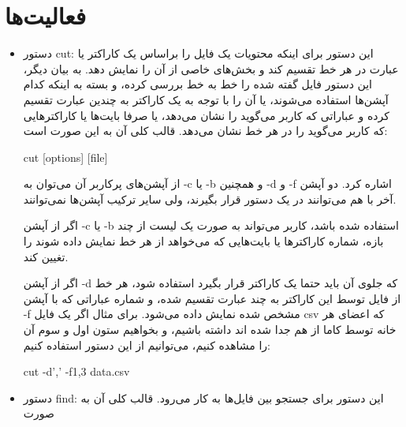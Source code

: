 \documentclass[12pt]{article}
\begin{document}
        \section{فعالیت‌ها}
        \begin{itemize}
            \item دستور \textenglish{cut}: 
            \cite{gnu-coreutils-cut}
            این دستور برای اینکه محتویات یک فایل را براساس یک کاراکتر یا عبارت در هر خط تقسیم کند و بخش‌های خاصی از آن را نمایش دهد. به بیان دیگر، این دستور فایل گفته شده را خط به خط بررسی کرده، و بسته به اینکه کدام آپشن‌ها استفاده می‌شوند، یا آن را با توجه به یک کاراکتر به چندین عبارت تقسیم کرده و عباراتی که کاربر می‌گوید را نشان می‌دهد، یا صرفا بایت‌ها یا کاراکترهایی که کاربر می‌گوید را در هر خط نشان می‌دهد.
            قالب کلی آن به این صورت است:

            \begin{english}
                cut [options] [file]
            \end{english}

            از آپشن‌های پرکاربر آن می‌توان به 
            \textenglish{-c}
            یا 
            \textenglish{-b}
            و همچنین
            \textenglish{-d}
            و 
            \textenglish{-f}
            اشاره کرد. دو آپشن آخر با هم می‌توانند در یک دستور قرار بگیرند، ولی سایر ترکیب آپشن‌ها نمی‌توانند.

            اگر از آپشن
            \textenglish{-c}
            یا 
            \textenglish{-b}
            استفاده شده باشد، کاربر می‌تواند به صورت یک لیست از چند بازه، شماره کاراکترها یا بایت‌هایی که می‌خواهد از هر خط نمایش داده شوند را تغیین کند.

            اگر از آپشن 
            \textenglish{-d}
            که جلوی آن باید حتما یک کاراکتر قرار بگیرد استفاده شود، هر خط از فایل توسط این کاراکتر به چند عبارت تقسیم شده، و شماره عباراتی که با آپشن
            \textenglish{-f}
            مشخص شده نمایش داده می‌شود. برای مثال اگر یک فایل 
            csv
            که اعضای هر خانه توسط کاما از هم جدا شده اند داشته باشیم، و بخواهیم ستون اول و سوم آن را مشاهده کنیم، می‌توانیم از این دستور استفاده کنیم:

            \begin{english}
                cut -d',' -f1,3 data.csv
            \end{english}

            \item دستور \textenglish{find}:
            این دستور برای جستجو بین فایل‌ها به کار می‌رود. قالب کلی آن به صورت 


\end{itemize}
\end{document}
